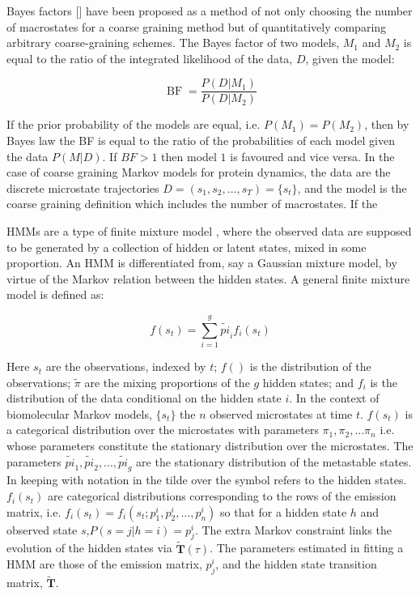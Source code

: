 Bayes factors [] have been proposed as a method of not only choosing the number of macrostates for a coarse graining method but of quantitatively comparing arbitrary coarse-graining schemes. The Bayes factor of two models, $M_{1}$ and $M_{2}$ is equal to the ratio of the integrated likelihood of the data, $D$, given the model: 

\begin{equation}
\operatorname{BF} = \frac{P(D|M_1)}{P(D|M_2)}
\end{equation}

If the prior probability of the models are equal, i.e. $P(M_1)=P(M_2)$, then by Bayes law the BF is equal to the ratio of the probabilities of each model given the data $P(M|D)$. If $BF > 1$ then model $1$ is favoured and vice versa. In the case of coarse graining Markov models for protein dynamics, the data are the discrete microstate trajectories $D = (s_1, s_2, ..., s_T)= \{s_t\}$, and the model is the coarse graining definition which includes the number of macrostates. If the  

HMMs are a type of finite mixture model \cite{mclachlanFiniteMixtureModels2000}, where the observed data are supposed to be generated by a collection of hidden or latent states, mixed in some proportion. An HMM is differentiated from, say a Gaussian mixture model, by virtue of the Markov relation between the hidden states. A general finite mixture model is defined as: 

\begin{equation}
    f(s_{t}) = \sum_{i=1}^{g}\tilde{pi}_{i} f_{i}(s_{t})
\end{equation}

Here $s_{t}$ are the observations, indexed by $t$; $f()$ is the distribution of the observations; $\tilde{\pi}$ are the mixing proportions of the $g$ hidden states; and $f_{i}$ is the distribution of the data  conditional on the hidden state $i$. In the context of biomolecular Markov models, $\{s_t\}$ the $n$ observed microstates at time $t$. $f(s_{t})$ is a categorical distribution over the  microstates with parameters $\pi_1, \pi_2, ... \pi_n$ i.e. whose parameters constitute the stationary distribution over the microstates. The parameters  $\tilde{pi}_{1},\tilde{pi}_{2}, ..., \tilde{pi}_{g}$ are the stationary distribution of the metastable states. In keeping with notation in \cite{noeProjectedHiddenMarkov2013a} the tilde over the symbol refers to the hidden states.  $f_{i}(s_t)$ are categorical distributions corresponding to the rows of the emission matrix, i.e. $f_{i}(s_t)= f_{i}(s_t; p^{i}_1, p^{i}_2, ..., p^{i}_n)$ so that for a hidden state $h$ and observed state $s$,$P(s=j|h=i) = p^{i}_{j}$. The extra Markov constraint links the evolution of the hidden states via $\tilde{\mathbf{T}}(\tau)$. The parameters estimated in fitting a HMM are those of the emission matrix, $p^{i}_{j}$, and the hidden state transition matrix, $\tilde{\mathbf{T}}$.

